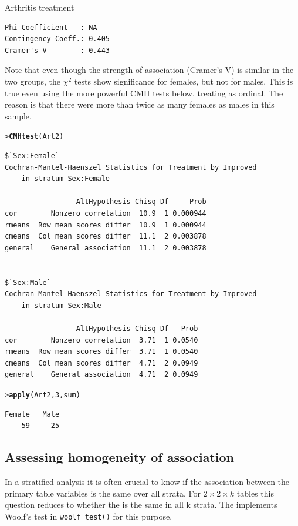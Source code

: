 \documentclass[10pt,krantz2]{krantz}\usepackage[]{graphicx}\usepackage[]{color}
\makeatletter
\newcommand{\hlnum}[1]{\textcolor[rgb]{0.686,0.059,0.569}{#1}}%
\newcommand{\hlstd}[1]{\textcolor[rgb]{0.345,0.345,0.345}{#1}}%
\newcommand{\hlkwd}[1]{\textcolor[rgb]{0.737,0.353,0.396}{\textbf{#1}}}%
\newenvironment{kframe}{%
 \def\at@end@of@kframe{}%
 \ifinner\ifhmode%
  \def\at@end@of@kframe{\end{minipage}}%
  \begin{minipage}{\columnwidth}%
 \fi\fi%
 \def\FrameCommand##1{\hskip\@totalleftmargin \hskip-\fboxsep
 \colorbox{shadecolor}{##1}\hskip-\fboxsep
     \hskip-\linewidth \hskip-\@totalleftmargin \hskip\columnwidth}%
 \MakeFramed {\advance\hsize-\width
   \@totalleftmargin\z@ \linewidth\hsize
   \@setminipage}}%
 {\par\unskip\endMakeFramed%
 \at@end@of@kframe}
\newenvironment{knitrout}{}{} %
\renewenvironment{knitrout}{\small\renewcommand{\baselinestretch}{.85}}{} %
\makeatother
\begin{document}
\begin{Example}[arthrit3]{Arthritis treatment}
\begin{knitrout}
\begin{kframe}
\begin{verbatim}
Phi-Coefficient   : NA 
Contingency Coeff.: 0.405 
Cramer's V        : 0.443 
\end{verbatim}
\end{kframe}
\end{knitrout}
Note that even though the strength of association (Cramer's V)
is similar in the two groups, the $\chi^2$ tests show
significance for females, but not for males.
This is true even using the more powerful CMH tests below, treating
 as ordinal.  The reason is that there were more than
twice as many females as males in this sample.
\begin{knitrout}
\color{fgcolor}\begin{kframe}
\begin{alltt}
\hlstd{> }\hlkwd{CMHtest}\hlstd{(Art2)}
\end{alltt}
\begin{verbatim}
$`Sex:Female`
Cochran-Mantel-Haenszel Statistics for Treatment by Improved 
	in stratum Sex:Female 

                 AltHypothesis Chisq Df     Prob
cor        Nonzero correlation  10.9  1 0.000944
rmeans  Row mean scores differ  10.9  1 0.000944
cmeans  Col mean scores differ  11.1  2 0.003878
general    General association  11.1  2 0.003878


$`Sex:Male`
Cochran-Mantel-Haenszel Statistics for Treatment by Improved 
	in stratum Sex:Male 

                 AltHypothesis Chisq Df   Prob
cor        Nonzero correlation  3.71  1 0.0540
rmeans  Row mean scores differ  3.71  1 0.0540
cmeans  Col mean scores differ  4.71  2 0.0949
general    General association  4.71  2 0.0949
\end{verbatim}
\begin{alltt}
\hlstd{> }\hlkwd{apply}\hlstd{(Art2,} \hlnum{3}\hlstd{, sum)}
\end{alltt}
\begin{verbatim}
Female   Male 
    59     25 
\end{verbatim}
\end{kframe}
\end{knitrout}

\end{Example}

\subsection{Assessing homogeneity of association}\label{sec:twoway-homog}
In a stratified analysis
it is often  crucial to know if the association between the
primary table variables is the same over all strata.  For
\(2 \times  2 \times k\) tables this question reduces to whether the  is
the same in all k strata. The  implements
Woolf's test \citep{Woolf:1995} in \verb|woolf_test()|
for this purpose.
\end{document}
